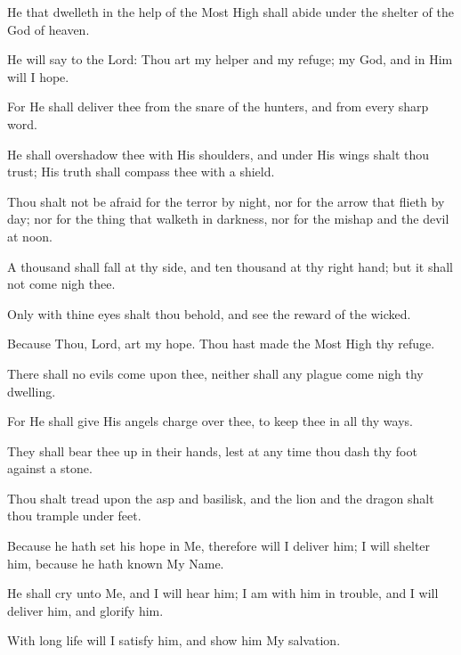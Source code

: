 He that dwelleth in the help of the Most High shall abide under the shelter of the God of heaven.

He will say to the Lord: Thou art my helper and my refuge; my God, and in Him will I hope.

For He shall deliver thee from the snare of the hunters, and from every sharp word.

He shall overshadow thee with His shoulders, and under His wings shalt thou trust; His truth shall compass thee with a shield.

Thou shalt not be afraid for the terror by night, nor for the arrow that flieth by day; nor for the thing that walketh in darkness, nor for the mishap and the devil at noon.

A thousand shall fall at thy side, and ten thousand at thy right hand; but it shall not come nigh thee.

Only with thine eyes shalt thou behold, and see the reward of the wicked.

Because Thou, Lord, art my hope. Thou hast made the Most High thy refuge.

There shall no evils come upon thee, neither shall any plague come nigh thy dwelling.

For He shall give His angels charge over thee, to keep thee in all thy ways.

They shall bear thee up in their hands, lest at any time thou dash thy foot against a stone.

Thou shalt tread upon the asp and basilisk, and the lion and the dragon shalt thou trample under feet.

Because he hath set his hope in Me, therefore will I deliver him; I will shelter him, because he hath known My Name.

He shall cry unto Me, and I will hear him; I am with him in trouble, and I will deliver him, and glorify him.

With long life will I satisfy him, and show him My salvation.
